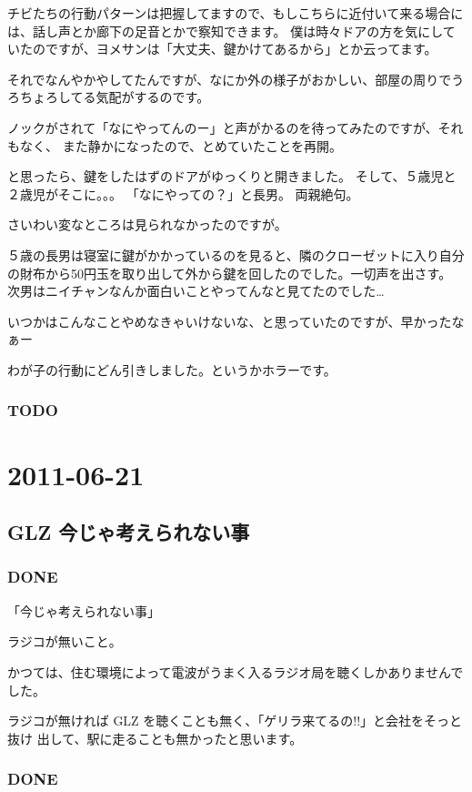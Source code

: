 \documentclass[11pt]{article}
\begin{document}
チビたちの行動パターンは把握してますので、もしこちらに近付いて来る場合には、話し声とか廊下の足音とかで察知できます。
僕は時々ドアの方を気にしていたのですが、ヨメサンは「大丈夫、鍵かけてあるから」とか云ってます。

それでなんやかやしてたんですが、なにか外の様子がおかしい、部屋の周りでうろちょろしてる気配がするのです。

ノックがされて「なにやってんのー」と声がかるのを待ってみたのですが、それもなく、
また静かになったので、とめていたことを再開。

と思ったら、鍵をしたはずのドアがゆっくりと開きました。
そして、５歳児と２歳児がそこに。。。
「なにやっての？」と長男。
両親絶句。

さいわい変なところは見られなかったのですが。

５歳の長男は寝室に鍵がかかっているのを見ると、隣のクローゼットに入り自分の財布から50円玉を取り出して外から鍵を回したのでした。一切声を出さす。
次男はニイチャンなんか面白いことやってんなと見てたのでした\ldots{}

いつかはこんなことやめなきゃいけないな、と思っていたのですが、早かったなぁー

わが子の行動にどん引きしました。というかホラーです。
\subsubsection{\textbf{TODO}}
\label{sec-105_1_2}
\section{2011-06-21}
\label{sec-106}
\subsection{GLZ 今じゃ考えられない事}
\label{sec-106_1}
\subsubsection{\textbf{DONE}}
\label{sec-106_1_1}

「今じゃ考えられない事」

ラジコが無いこと。

かつては、住む環境によって電波がうまく入るラジオ局を聴くしかありませんでした。

ラジコが無ければ GLZ を聴くことも無く、「ゲリラ来てるの!!」と会社をそっと抜け
出して、駅に走ることも無かったと思います。
\subsubsection{\textbf{DONE}}
\label{sec-106_1_2}
\end{document}
